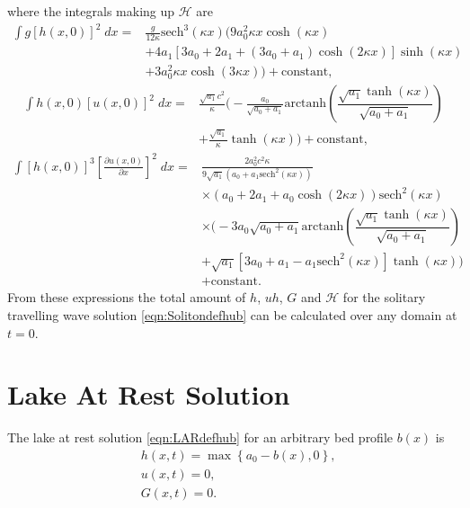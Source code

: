 where the integrals making up $\mathcal{H}$ are
\begin{align*}
\int g\left[h(x,0)\right]^2 \; dx ={}& \frac{g}{12 \kappa }\text{sech}^3\left(\kappa x\right) \Bigg(9a_0^2 \kappa x \cosh\left(\kappa x\right) \\ &+ 4 a_1 \left[3a_0 + 2 a_1 + \left(3a_0 + a_1\right)\cosh\left(2\kappa x\right)\right] \sinh\left(\kappa x\right) \\ & + 3 a_0^2 \kappa x \cosh\left(3\kappa x\right)\Bigg) + \text{constant},
\end{align*}
\begin{align*}
\int h(x,0)\left[u(x,0)\right]^2 \; dx = {}& \frac{\sqrt{a_1}c^2}{\kappa} \Bigg( -\frac{a_0}{\sqrt{a_0 + a_1}} \text{arctanh}\left(\dfrac{\sqrt{a_1} \tanh\left(\kappa x\right)}{\sqrt{a_0 + a_1}}\right)\\ &+ \frac{\sqrt{a_1}}{\kappa}\tanh\left(\kappa x\right)\Bigg)  + \text{constant},
\end{align*} 
\begin{align*}
\int \left[h(x,0)\right]^3 \left[\frac{\partial u(x,0)}{\partial x}\right]^2 \; dx = {}& \frac{2a_0^2c^2 \kappa }{9 \sqrt{a_1} \left(a_0 + a_1\text{sech}^2\left(\kappa x \right) \right)}   \\ &\times\left(a_0 + 2a_1 + a_0 \cosh\left(2\kappa x\right) \right) \text{sech}^2\left(\kappa x\right) \\&\times \Bigg(-3 a_0 \sqrt{a_0 + a_1}\text{arctanh}\left(\dfrac{\sqrt{a_1} \tanh\left(\kappa x\right)}{\sqrt{a_0 + a_1}}\right)  \\ &+ \sqrt{a_1}\left[3a_0 + a_1 - a_1\text{sech}^2\left(\kappa x\right)\right]\tanh(\kappa x) \Bigg) \\&+ \text{constant}.
\end{align*}
\endgroup
From these expressions the total amount of $h$, $uh$, $G$ and $\mathcal{H}$ for the solitary travelling wave solution \eqref{eqn:Solitondefhub} can be calculated over any domain at $t=0$.

\section{Lake At Rest Solution}
The lake at rest solution \eqref{eqn:LARdefhub} for an arbitrary bed profile $b(x)$ is
	\begin{align*}
	&h(x,t) = \max\left\lbrace a_0 - b(x), 0 \right\rbrace, \\
	&u(x,t) = 0 , \\
	&G(x,t) = 0 .
	\end{align*}

